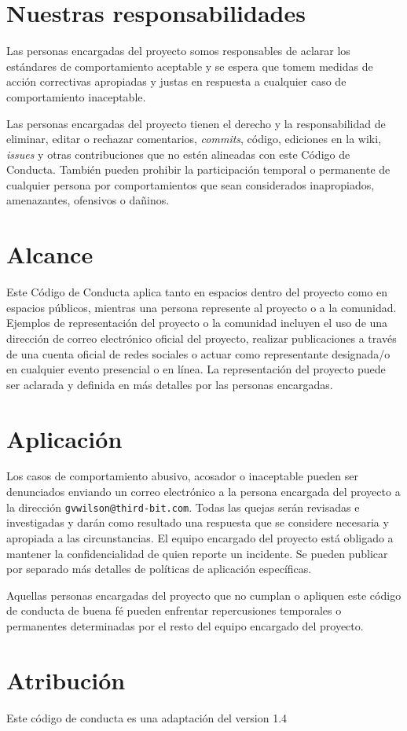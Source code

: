 \section*{Nuestras responsabilidades}

Las personas encargadas del proyecto somos responsables de aclarar los estándares de
comportamiento aceptable y se espera que tomem medidas de acción correctivas
apropiadas y justas en respuesta a cualquier caso de comportamiento inaceptable.

Las personas encargadas del proyecto tienen el derecho y la responsabilidad de
eliminar, editar o rechazar comentarios, \emph{commits}, código, ediciones en la wiki, \emph{issues} y otras
contribuciones que no estén alineadas con este Código de Conducta. También pueden
prohibir la participación temporal o permanente de cualquier persona por comportamientos
que sean considerados inapropiados, amenazantes, ofensivos o dañinos.

\section*{Alcance}

Este Código de Conducta aplica tanto en espacios dentro del proyecto
como en espacios públicos, mientras una persona represente al proyecto o a
la comunidad. Ejemplos de representación del proyecto o la comunidad incluyen
el uso de una dirección de correo electrónico oficial del proyecto,
realizar publicaciones a través de una cuenta oficial de redes sociales
o actuar como representante designada/o en cualquier evento presencial o en línea.
La representación del proyecto puede ser aclarada y definida en más
detalles por las personas encargadas.

\section*{Aplicación}

Los casos de comportamiento abusivo, acosador o inaceptable
pueden ser denunciados enviando un correo electrónico a la persona encargada del proyecto a la dirección \texttt{gvwilson@third-bit.com}.
Todas las quejas serán revisadas e investigadas y darán como resultado
una respuesta que se considere necesaria y apropiada a las circunstancias.
El equipo encargado del proyecto está obligado a mantener la confidencialidad de quien reporte un incidente.
Se pueden publicar por separado más detalles
de políticas de aplicación específicas.

Aquellas personas encargadas del proyecto que no cumplan o apliquen 
este código de conducta de buena fé pueden enfrentar repercusiones
temporales o permanentes determinadas por el resto del equipo encargado
del proyecto.

\section*{Atribución}

Este código de conducta es una adaptación del
 version 1.4
